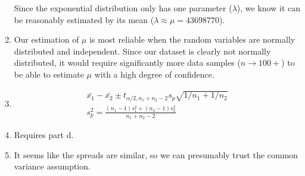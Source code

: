 \documentclass{article}
\begin{document}
\begin{enumerate}[label=(\alph*)]
          Since the exponential distribution only has one parameter (\(\lambda\)), we know it can be reasonably estimated by its mean (\(\lambda \approx \mu = 43698770\)).
    \item Our estimation of \(\mu\) is most reliable when the random variables are normally distributed and independent. Since our dataset is clearly not normally distributed, it would require significantly more data samples (\(n \rightarrow 100+\)) to be able to estimate \(\mu\) with a high degree of confidence.
    \item \begin{align*}
              \bar{x_1} - \bar{x_2} \pm t_{\alpha/2,n_1+n_2-2} s_p \sqrt{1/n_1 + 1/n_2} \\
              s_p^2 = \frac{(n_1-1)s_1^2+(n_2-1)s_2^2}{n_1+n_2-2}
          \end{align*}
    \item Requires part d. %
    \item It seems like the spreads are similar, so we can presumably trust the common variance assumption.
\end{enumerate}

\pagebreak
\end{document}
